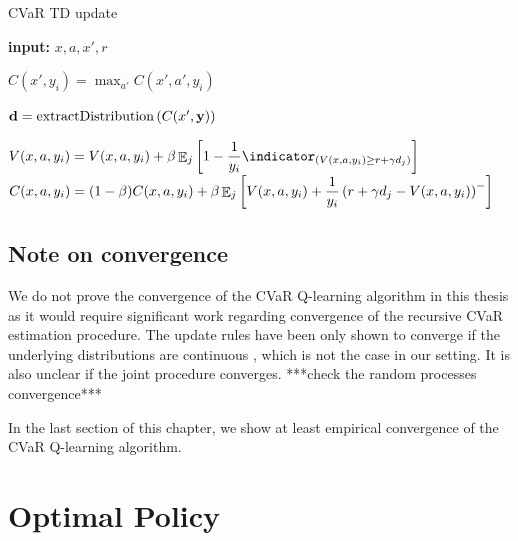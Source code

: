\begin{algorithm}
\caption{CVaR TD update}
\begin{algorithmic}[1]\label{alg:cvartd}

    \STATE \textbf{input:} $x, a, x', r$
    
	\STATE $C(x', y_i) = \max_{a'} C(x', a', y_i)$ \label{alg:cvartd:1}
	\ENDFOR
	
	\STATE $\mathbf{d}= \text{extractDistribution}\left( {C(x', \mathbf{y})} \right)$ \label{alg:cvartd:2}

	\STATE $V(x, a, y_i) = V(x, a, y_i) + \beta \expect_j\bsquare{1 - \dfrac{1}{y_i}\indicator_{(V(x, a, y_i) \ge r+\gamma d_j)}}$  \label{alg:cvartd:4}
	\STATE $C(x, a, y_i) = (1-\beta)C(x, a, y_i) + \beta\mathop{\mathbb{E}}_j\left[ {V(x, a, y_i) + \dfrac{1}{y_i}\left( {r+\gamma d_j - V(x, a, y_i)} \right)^-} \right]$  \label{alg:cvartd:5}
	\ENDFOR
	
\end{algorithmic}
\end{algorithm}

\subsection{Note on convergence}
We do not prove the convergence of the CVaR Q-learning algorithm in this thesis as it would require significant work regarding convergence of the recursive CVaR estimation procedure. The update rules  have been only shown to converge if the underlying distributions are continuous \cite{...}, which is not the case in our setting. It is also unclear if the joint procedure converges. ***check the random processes convergence***

In the last section of this chapter, we show at least empirical convergence of the CVaR Q-learning algorithm.




\section{Optimal Policy}\label{sec:qpolicy}

